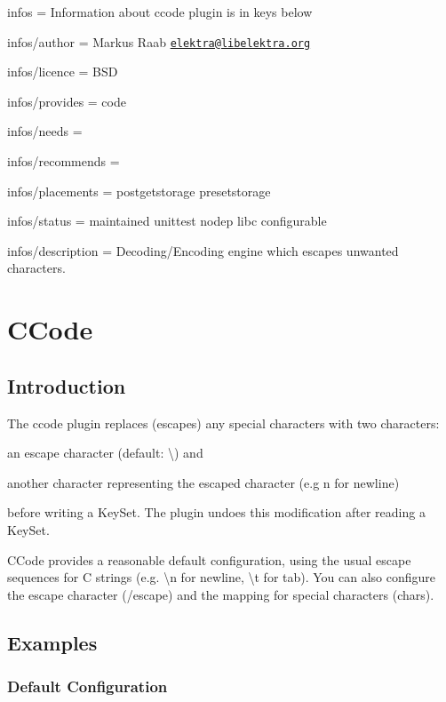 
\begin{DoxyItemize}
\item infos = Information about ccode plugin is in keys below
\item infos/author = Markus Raab \href{mailto:elektra@libelektra.org}{\tt elektra@libelektra.\+org}
\item infos/licence = B\+SD
\item infos/provides = code
\item infos/needs =
\item infos/recommends =
\item infos/placements = postgetstorage presetstorage
\item infos/status = maintained unittest nodep libc configurable
\item infos/description = Decoding/\+Encoding engine which escapes unwanted characters.
\end{DoxyItemize}\hypertarget{autotoc_md78_src_plugins_ccode_README_md}{}\section{C\+Code}\label{autotoc_md78_src_plugins_ccode_README_md}
\hypertarget{autotoc_md78_autotoc_md79}{}\subsection{Introduction}\label{autotoc_md78_autotoc_md79}
The {\ttfamily ccode} plugin replaces (escapes) any special characters with two characters\+:


\begin{DoxyItemize}
\item an escape character (default\+: {\ttfamily \textbackslash{}}) and
\item another character representing the escaped character (e.\+g {\ttfamily n} for newline)
\end{DoxyItemize}

before writing a {\ttfamily Key\+Set}. The plugin undoes this modification after reading a {\ttfamily Key\+Set}.

C\+Code provides a reasonable default configuration, using the usual escape sequences for C strings (e.\+g. {\ttfamily \textbackslash{}n} for newline, {\ttfamily \textbackslash{}t} for tab). You can also configure the escape character ({\ttfamily /escape}) and the mapping for special characters ({\ttfamily chars}).\hypertarget{autotoc_md78_autotoc_md80}{}\subsection{Examples}\label{autotoc_md78_autotoc_md80}
\hypertarget{autotoc_md78_autotoc_md81}{}\subsubsection{Default Configuration}\label{autotoc_md78_autotoc_md81}

